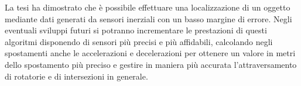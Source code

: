 \documentclass[12pt,a4paper,openright,twoside]{report}
\renewcommand{\chaptermark}[1]{\markboth{\thechapter.\ #1}{}}
\begin{document}
La tesi ha dimostrato che è possibile effettuare una localizzazione di un oggetto mediante dati generati da sensori inerziali con un basso margine di errore. 
Negli eventuali sviluppi futuri si potranno incrementare le prestazioni di questi algoritmi disponendo di sensori più precisi e più affidabili, calcolando negli spostamenti anche le accelerazioni e decelerazioni per ottenere un valore in metri dello spostamento più preciso e gestire in maniera più accurata l'attraversamento di rotatorie e di intersezioni in generale.
\clearpage{\pagestyle{empty}\cleardoublepage}

\renewcommand{\chaptermark}[1]{\markright{\thechapter \ #1}{}}
\lhead[\fancyplain{}{\bfseries\thepage}]{\fancyplain{}{\bfseries\rightmark}}
\end{document}
